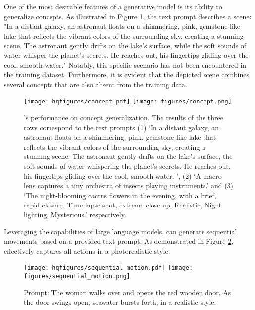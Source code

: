 One of the most desirable features of a generative model is its ability to generalize concepts. As illustrated in Figure \ref{fig:concept}, the text prompt describes a scene: "In a distant galaxy, an astronaut floats on a shimmering, pink, gemstone-like lake that reflects the vibrant colors of the surrounding sky, creating a stunning scene. The astronaut gently drifts on the lake's surface, while the soft sounds of water whisper the planet's secrets. He reaches out, his fingertips gliding over the cool, smooth water." Notably, this specific scenario has not been encountered in the training dataset. Furthermore, it is evident that the depicted scene combines several concepts that are also absent from the training data.
\begin{figure}[!htbp]
    \centering
    \ifhq
    \texttt{[image: hqfigures/concept.pdf]}
    \else
    \texttt{[image: figures/concept.png]}
    \fi
    \caption{\small {\nameofmethod{}'s performance on concept generalization. The results of the three rows correspond to the text prompts (1) `In a distant galaxy, an astronaut floats on a shimmering, pink, gemstone-like lake that reflects the vibrant colors of the surrounding sky, creating a stunning scene. The astronaut gently drifts on the lake's surface, the soft sounds of water whispering the planet's secrets. He reaches out, his fingertips gliding over the cool, smooth water. ', (2) `A macro lens captures a tiny orchestra of insects playing instruments.' and (3) `The night-blooming cactus flowers in the evening, with a brief, rapid closure. Time-lapse shot, extreme close-up. Realistic, Night lighting, Mysterious.' respectively.} }
    \label{fig:concept}
\end{figure}

Leveraging the capabilities of large language models, \nameofmethod{} can generate sequential movements based on a provided text prompt. As demonstrated in Figure \ref{fig:sequential-move}, \nameofmethod{} effectively captures all actions in a photorealistic style.
\begin{figure}[ht]
    \centering
    \ifhq
    \texttt{[image: hqfigures/sequential\_motion.pdf]}
    \else
    \texttt{[image: figures/sequential\_motion.png]}
    \fi
    \caption{{Prompt: The woman walks over and opens the red wooden door. As the door swings open, seawater bursts forth, in a realistic style.}}
    \label{fig:sequential-move}
\end{figure}

